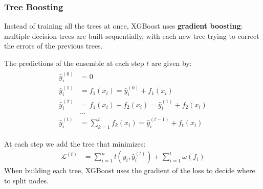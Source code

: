 \documentclass{beamer}
\begin{document}
\begin{frame}
	\frametitle{Tree Boosting}
	\small Instead of training all the trees at once, XGBoost uses \textbf{gradient boosting}: multiple decision trees are built sequentially, with each new tree trying to correct the errors of the previous trees.
	
	The predictions of the ensemble at each step $t$ are given by:
	\begin{align*}
	\begin{split}\hat{y}_i^{(0)} &= 0\\
	\hat{y}_i^{(1)} &= f_1(x_i) = \hat{y}_i^{(0)} + f_1(x_i)\\
	\hat{y}_i^{(2)} &= f_1(x_i) + f_2(x_i)= \hat{y}_i^{(1)} + f_2(x_i)\\
	&\dots\\
	\hat{y}_i^{(t)} &= \sum_{k=1}^t f_k(x_i)= \hat{y}_i^{(t-1)} + f_t(x_i)\end{split}
	\end{align*}
	
	At each step we add the tree that minimizes:
	\begin{align*}
	\mathcal{L}^{(t)} & = \sum_{i=1}^n l(y_i, \hat{y}_i^{(t)}) + \sum_{i=1}^t\omega(f_i) 
	\end{align*}
	When building each tree, XGBoost uses the gradient of the loss to decide where to split nodes.
	
\end{frame}
\end{document}
